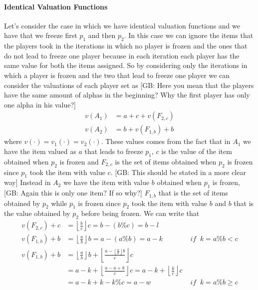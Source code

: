 \documentclass{article}
\newcommand{\gb}[1]{{\color{red}[GB: #1]}}
\begin{document}
\paragraph{Identical Valuation Functions}
Let's consider the case in which we have identical valuation functions and we have that we freeze first $p_1$ and then $p_2$. In this case we can ignore the items that the players took in the iterations in which no player is frozen and the ones that do not lead to freeze one player because in each iteration each player has the same value for both the items assigned. So by considering only the iterations in which a player is frozen and the two that lead to freeze one player we can consider the valuations of each player set as 
\gb{Here you mean that the players have the same amount of alphas in the beginning? Why the first player has only one alpha in his value?}
\begin{align*}
    v(A_1) & = a + c + v(F_{2,c})\\
    v(A_2) & = b + v(F_{1,b}) + b
\end{align*}
where $v(\cdot) = v_1(\cdot) = v_2(\cdot)$. These values comes from the fact that in $A_1$ we have the item valued as $a$ that leads to freeze $p_1$, $c$ is the value of the item obtained when $p_2$ is frozen and $F_{2,c}$ is the set of items obtained when $p_2$ is frozen since $p_1$ took the item with value $c$.
\gb{This should be stated in a more clear way}
Instead in $A_2$ we have the item with value $b$ obtained when $p_1$ is frozen,
\gb{Again this is only one item? If so why?}
$F_{1,b}$ that is the set of items obtained by $p_2$ while $p_1$ is frozen since $p_2$ took the item with value $b$ and $b$ that is the value obtained by $p_2$ before being frozen.
We can write that 
\begin{align}
    v(F_{2,c}) + c &= \left\lfloor \frac{b}{c}\right\rfloor c = b - (b\% c) = b-l \label{v(F2c)+c-identical-valuation-functions-second-block}\\
    v(F_{1,b}) + b &= \left\lfloor \frac{a}{b}\right\rfloor b = a - (a\% b) = a - k  &\textit{ if } \:k = a\% b < c \label{v(F1b)+b-amodb<c-identical-valuation-functions-second-block}\\
    v(F_{1,b}) + b &=\left\lfloor \frac{a}{b}\right\rfloor b + \left\lfloor \frac{a - \left\lfloor \frac{a}{b}\right\rfloor b }{c}\right \rfloor c \label{v(F1b)+b-amodb>c-identical-valuation-functions-second-block} \\&= a-k + \left\lfloor \frac{a- a + k }{c} \right\rfloor c = a - k + \left\lfloor \frac{k}{c}\right\rfloor c \\&= a - k + k - k\% c  = a - w &\textit{ if } \:k = a\% b \ge c
\end{align}
\end{document}
